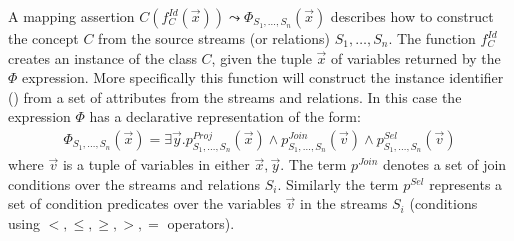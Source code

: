 A mapping assertion $C(f_C^{Id}(\vec{x})) \leadsto \Phi_{S_1,\ldots,S_n}(\vec{x})$ describes how to construct the concept $C$ from the source streams (or relations) $S_1,\ldots,S_n$. 
The function $f_C^{Id}$ creates an instance of the class $C$, given the tuple $\vec{x}$ of variables returned by the $\Phi$ expression. 
More specifically this function will construct the instance identifier (\uri) from a set of attributes from the streams and relations.
In this case the expression $\Phi$ has a declarative representation of the form:
\begin{align*}
\Phi_{S_1,\ldots,S_n}(\vec{x})=\exists\vec{y}.p^{Proj}_{S_1,\ldots,S_n}(\vec{x}) \wedge p^{Join}_{S_1,\ldots,S_n}(\vec{v}) \wedge p_{S_1,\ldots,S_n}^{Sel}(\vec{v})
\end{align*}
where $\vec{v}$ is a tuple of variables in either $\vec{x},\vec{y}$. 
The term $p^{Join}$ denotes a set of join conditions over the streams and relations $S_i$. 
Similarly the term $p^{Sel}$ represents a set of condition predicates over the variables $\vec{v}$ in the streams $S_i$ (\eg conditions using $<,\leq,\geq,>,=$ operators).
\\
%

